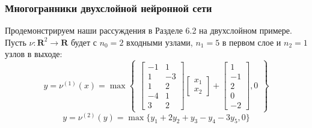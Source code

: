 \documentclass[russian]{lecture-notes}
\begin{document}
	\subsubsection{Многогранники двухслойной нейронной сети }
	Продемонстрируем наши рассуждения в Разделе 6.2 на двухслойном примере. Пусть $\nu :\mathbf{R}^2 \rightarrow \mathbf{R}$ будет с $n_0=2$ входными узлами, $n_1 = 5$ в первом слое и $n_2 = 1$ узлов в выходе:
	\[
		y = \nu^{(1)}(x) = \max 
		\begin{Bmatrix}
			\begin{bmatrix}
			-1 &1 \\
			1 &-3 \\
			1 &2 \\
			-4 &1\\
			3 &2 
			\end{bmatrix}
		\begin{bmatrix}
		x_1\\
		x_2
		\end{bmatrix} 
		+ \begin{bmatrix}
		1\\
		-1\\
		2\\
		0\\
		-2
		\end{bmatrix}, 0
		\end{Bmatrix}
	\]
	\[
		y = \nu^{(2)}(y) = \max\{y_1 + 2y_2 + y_3 - y_4 - 3y_5, 0\}
	\]
	
\end{document}
